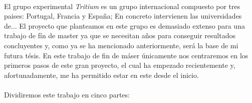 \paragraph {}
El grupo experimental \textit{Tritium} es un grupo internacional compuesto por tres paises: Portugal, Francia y España; En concreto intervienen las universidades de...  El proyecto que planteamos en este grupo es demasiado extenso para una trabajo de fín de master ya que se necesitan años para conseguir resultados concluyentes y, como ya se ha mencionado anteriormente, será la base de mi futura tésis. En este trabajo de fin de máser únicamente nos centraremos en los primeros pasos de este gran proyecto, el cual ha empezado recientemente y, afortunadamente, me ha permitido estar en este desde el inicio.

\paragraph {}
Dividiremos este trabajo en cinco partes:
